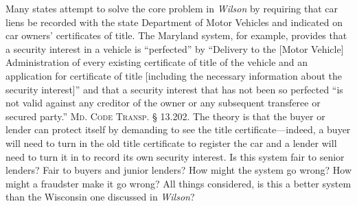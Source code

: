 \item Many states attempt to solve the core problem in \textit{Wilson} by
requiring that car liens be recorded with the state Department of Motor
Vehicles and indicated on car owners' certificates of title. The Maryland
system, for example, provides that a security interest in a vehicle is
``perfected'' by ``Delivery to the [Motor Vehicle] Administration of every
existing certificate of title of the vehicle and an application for certificate
of title [including the necessary information about the security interest]''
and that a security interest that has not been so perfected ``is not valid
against any creditor of the owner or any subsequent transferee or secured
party.'' \textsc{Md. Code Transp.} {\S} 13.202. The theory is that the buyer or
lender
can protect itself by demanding to see the title certificate---indeed, a buyer
will need to turn in the old title certificate to register the car and a lender
will need to turn it in to record its own security interest. Is this system
fair to senior lenders? Fair to buyers and junior lenders? How might the system
go wrong? How might a fraudster make it go wrong? All things considered, is
this a better system than the Wisconsin one discussed in \textit{Wilson}?

